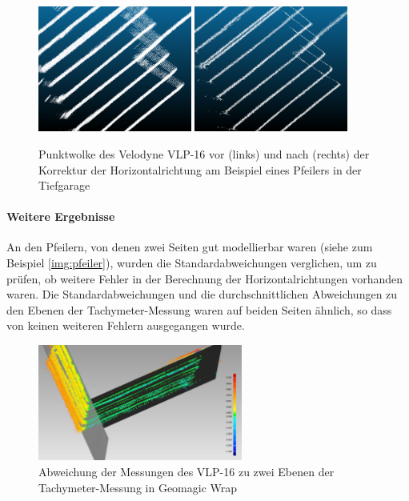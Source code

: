 \documentclass[a4paper,12pt,bibliography=totoc, listof=totoc,titlepage,pointlessnumbers]{scrreprt}
\begin{document}
\begin{figure}
 \centering
 \includegraphics[width=0.45\textwidth]{./img/punktwolke_f.png}
 \includegraphics[width=0.45\textwidth]{./img/punktwolke_k.png}
 \caption{Punktwolke des Velodyne VLP-16 vor (links) und nach (rechts) der Korrektur der Horizontalrichtung am Beispiel eines Pfeilers in der Tiefgarage}
 \label{img:fehlerWolke}
\end{figure}

\paragraph{Weitere Ergebnisse}
An den Pfeilern, von denen zwei Seiten gut modellierbar waren (siehe zum Beispiel \autoref{img:pfeiler}), wurden die Standardabweichungen verglichen, um zu prüfen, ob weitere Fehler in der Berechnung der Horizontalrichtungen vorhanden waren. Die Standardabweichungen und die durchschnittlichen Abweichungen zu den Ebenen der Tachymeter-Messung waren auf beiden Seiten ähnlich, so dass von keinen weiteren Fehlern ausgegangen wurde.

\begin{figure}
 \centering
 \includegraphics[width=0.60\textwidth]{./img/pfeiler.jpg}
 \caption{Abweichung der Messungen des VLP-16 zu zwei Ebenen der Tachymeter-Messung in Geomagic Wrap}
 \label{img:pfeiler}
\end{figure}
\end{document}
